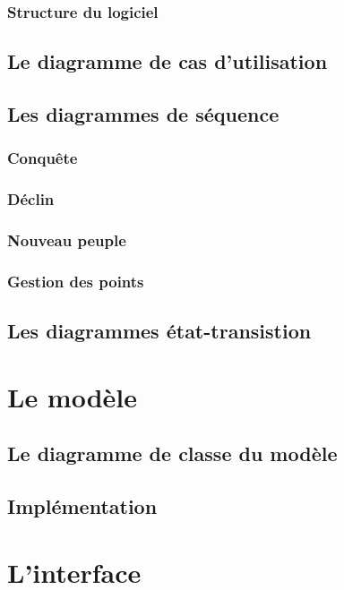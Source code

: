 \documentclass[11pt]{report}
\begin{document}
			\subsection{Structure du logiciel}

		\section{Le diagramme de cas d'utilisation}

		\section{Les diagrammes de séquence}

			\subsection{Conquête}

			\subsection{Déclin}

			\subsection{Nouveau peuple}

			\subsection{Gestion des points}

		\section{Les diagrammes état-transistion}

	\chapter{Le modèle}

		\section{Le diagramme de classe du modèle}

		\section{Implémentation}

	\chapter{L'interface}
\end{document}
